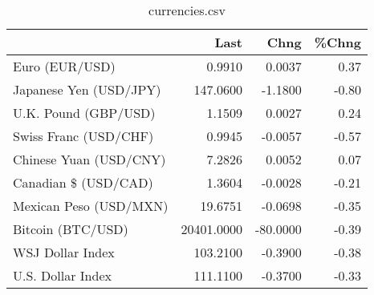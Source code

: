 \documentclass{article}%
\begin{document}
%


\begin{table}[htbp]%
\caption{currencies.csv}%
\centering%
\begin{adjustbox}{width=1\textwidth}%
\begin{tabular}{lrrr}
\toprule
                       &       Last &     Chng &  \%Chng \\
\midrule
        Euro (EUR/USD) &     0.9910 &   0.0037 &   0.37 \\
Japanese Yen (USD/JPY) &   147.0600 &  -1.1800 &  -0.80 \\
  U.K. Pound (GBP/USD) &     1.1509 &   0.0027 &   0.24 \\
 Swiss Franc (USD/CHF) &     0.9945 &  -0.0057 &  -0.57 \\
Chinese Yuan (USD/CNY) &     7.2826 &   0.0052 &   0.07 \\
  Canadian \$ (USD/CAD) &     1.3604 &  -0.0028 &  -0.21 \\
Mexican Peso (USD/MXN) &    19.6751 &  -0.0698 &  -0.35 \\
     Bitcoin (BTC/USD) & 20401.0000 & -80.0000 &  -0.39 \\
      WSJ Dollar Index &   103.2100 &  -0.3900 &  -0.38 \\
     U.S. Dollar Index &   111.1100 &  -0.3700 &  -0.33 \\
\bottomrule
\end{tabular}
%
\end{adjustbox}%
\end{table}

%
\end{document}
